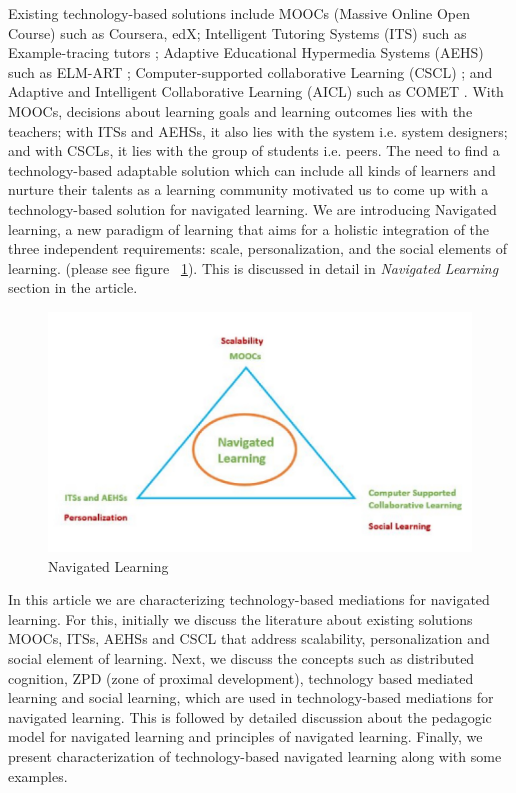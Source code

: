 \begin{multicols}{2}
Existing technology-based solutions include MOOCs (Massive Online Open Course) \cite{art2-key08} such as Coursera, edX; Intelligent Tutoring Systems (ITS) such as Example-tracing tutors \cite{art2-key04}; Adaptive Educational Hypermedia Systems (AEHS) such as ELM-ART \cite{art2-key09}; Computer-supported collaborative Learning (CSCL) \cite{art2-key22, art2-key34}; and Adaptive and Intelligent Collaborative Learning (AICL) \cite{art2-key35} such as COMET \cite{art2-key49}. With MOOCs, decisions about learning goals and learning outcomes lies with the teachers; with ITSs and AEHSs, it also lies with the system i.e. system  designers; and with CSCLs, it lies with the group of students i.e. peers. The need to find a technology-based adaptable solution which can include all kinds of learners and nurture their talents as a learning community motivated us to come up with a technology-based solution for navigated learning. We are introducing Navigated learning, a new paradigm of learning that aims for a holistic integration of the three independent requirements: scale, personalization, and the social elements of learning. (please see figure ~\ref{chap2-fig01}). This is discussed in detail in \textit{Navigated Learning} section in the article.
\setcounter{figure}{0}
\begin{figure}[H]
\centering
\includegraphics[scale=1.05]{src/Figures/chap2/chap2-fig01.jpg}
\caption{Navigated Learning}\label{chap2-fig01}
\end{figure}

In this article we are characterizing technology-based mediations for navigated learning. For this, initially we discuss the literature about existing solutions MOOCs, ITSs, AEHSs and CSCL that address scalability, personalization and social element of learning. Next, we discuss the concepts such as distributed cognition, ZPD (zone of proximal development), technology based mediated learning and social learning, which are used in technology-based mediations for navigated learning. This is followed by detailed discussion about the pedagogic model for navigated learning and principles of navigated learning. Finally, we present characterization of technology-based navigated learning along with some examples.


\end{multicols}
